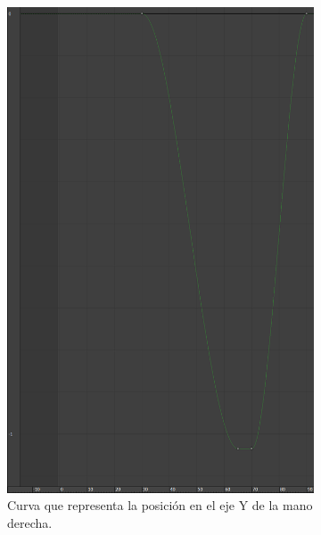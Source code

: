 \begin{figure}[H]
\begin{subfigure}[t]{0.32\textwidth}
       \includegraphics[width=\textwidth]{imagenes/manos/derecha/posY.png}
       \caption{Curva que representa la posición en el eje Y de la mano derecha.}
    \end{subfigure}
   \hfill
    \begin{subfigure}[t]{0.32\textwidth}
       \centering

\end{subfigure}
\end{figure}

